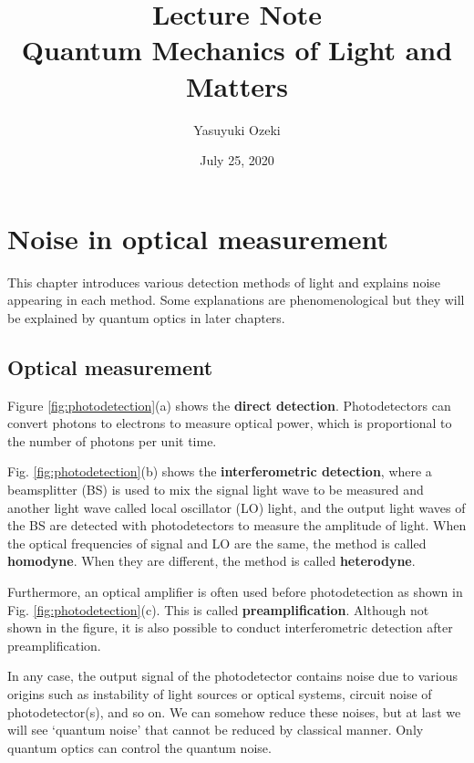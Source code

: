 \documentclass{book}
\begin{document}
\title{Lecture Note \\ Quantum Mechanics of Light and Matters}
\author{Yasuyuki Ozeki}
\date{July 25, 2020}

\maketitle
\tableofcontents
\mainmatter




\chapter{Noise in optical measurement}
This chapter introduces various detection methods of light and explains noise appearing in each method. Some explanations are phenomenological but they will be explained by quantum optics in later chapters.

\section{Optical measurement}
Figure \ref{fig:photodetection}(a) shows the \textbf{direct detection}. Photodetectors can convert photons to electrons to measure optical power, which is proportional to the number of photons per unit time. 

Fig. \ref{fig:photodetection}(b) shows the \textbf{interferometric detection}, where a beamsplitter (BS) is used to mix the signal light wave to be measured and another light wave called local oscillator (LO) light, and the output light waves of the BS are detected with photodetectors to measure the amplitude of light. When the optical frequencies of signal and LO are the same, the method is called \textbf{homodyne}. When they are different, the method is called \textbf{heterodyne}.

Furthermore, an optical amplifier is often used before photodetection as shown in Fig. \ref{fig:photodetection}(c). This is called \textbf{preamplification}. Although not shown in the figure, it is also possible to conduct interferometric detection after preamplification. 

In any case, the output signal of the photodetector contains noise due to various origins such as instability of light sources or optical systems, circuit noise of photodetector(s), and so on. We can somehow reduce these noises, but at last we will see `quantum noise' that cannot be reduced by classical manner. Only quantum optics can control the quantum noise.
\end{document}
